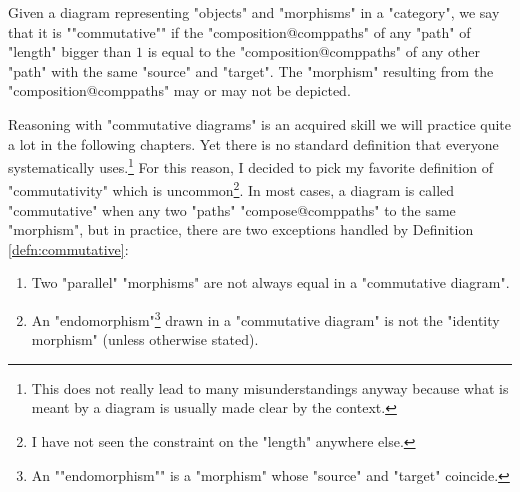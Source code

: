 \documentclass[main.tex]{subfiles}
\begin{document}
\begin{defn}[Commutativity]\label{defn:commutative}
	\AP Given a diagram representing "objects" and "morphisms" in a "category", we say that it is ""commutative"" if the "composition@comppaths" of any "path" of "length" bigger than $1$ is equal to the "composition@comppaths" of any other "path" with the same "source" and "target". The "morphism" resulting from the "composition@comppaths" may or may not be depicted.
\end{defn}
\begin{rem}[Convention]
	Reasoning with "commutative diagrams" is an acquired skill we will practice quite a lot in the following chapters. Yet there is no standard definition that everyone systematically uses.\footnote{This does not really lead to many misunderstandings anyway because what is meant by a diagram is usually made clear by the context.} For this reason, I decided to pick my favorite definition of "commutativity" which is uncommon\footnote{I have not seen the constraint on the "length" anywhere else.}. In most cases, a diagram is called "commutative" when any two "paths" "compose@comppaths" to the same "morphism", but in practice, there are two exceptions handled by Definition \ref{defn:commutative}:
	\begin{enumerate}
		\item Two "parallel" "morphisms" are not always equal in a "commutative diagram".
		\item An "endomorphism"\footnote{\AP An ""endomorphism"" is a "morphism" whose "source" and "target" coincide.} drawn in a "commutative diagram" is not the "identity morphism" (unless otherwise stated).
	\end{enumerate}
\end{rem}
\end{document}
